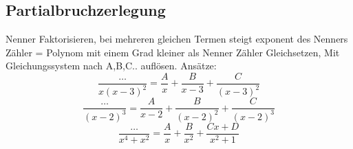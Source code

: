 \subsection{Partialbruchzerlegung}
Nenner Faktorisieren, bei mehreren gleichen Termen steigt exponent des Nenners
Zähler = Polynom mit einem Grad kleiner als Nenner
Zähler Gleichsetzen, Mit Gleichungssystem nach A,B,C.. auflösen.
Ansätze:
$$\frac{\dots}{x(x-3)^2} = \frac{A}{x} + \frac{B}{x-3} + \frac{C}{(x-3)^2}$$
$$\frac{\dots}{(x-2)^3} = \frac{A}{x-2} + \frac{B}{(x-2)^2} + \frac{C}{(x-2)^3}$$
$$\frac{\dots}{x^4 + x^2} = \frac{A}{x} + \frac{B}{x^2} + \frac{Cx + D}{x^2 + 1}$$